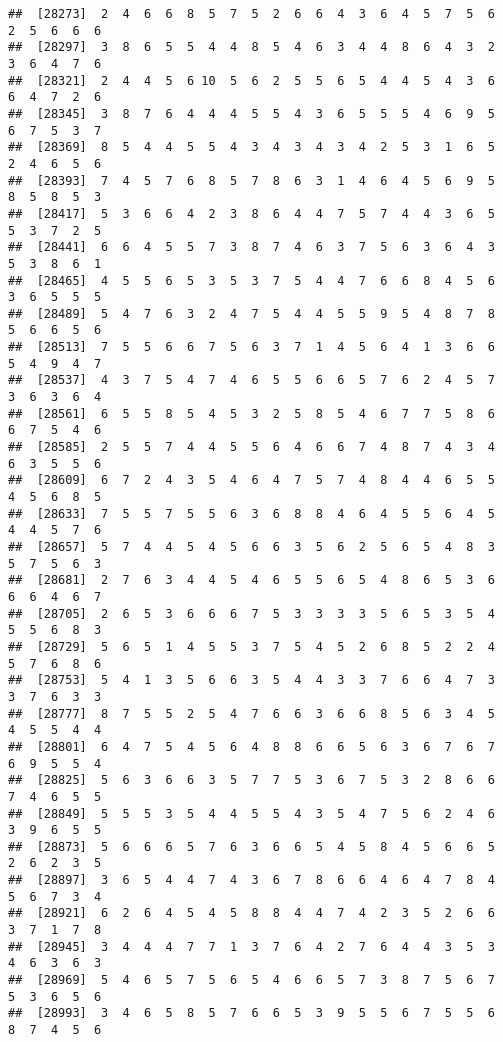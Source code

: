 \documentclass[
]{book}
\begin{document}
\begin{verbatim}
##  [28273]  2  4  6  6  8  5  7  5  2  6  6  4  3  6  4  5  7  5  6  2  5  6  6  6
##  [28297]  3  8  6  5  5  4  4  8  5  4  6  3  4  4  8  6  4  3  2  3  6  4  7  6
##  [28321]  2  4  4  5  6 10  5  6  2  5  5  6  5  4  4  5  4  3  6  6  4  7  2  6
##  [28345]  3  8  7  6  4  4  4  5  5  4  3  6  5  5  5  4  6  9  5  6  7  5  3  7
##  [28369]  8  5  4  4  5  5  4  3  4  3  4  3  4  2  5  3  1  6  5  2  4  6  5  6
##  [28393]  7  4  5  7  6  8  5  7  8  6  3  1  4  6  4  5  6  9  5  8  5  8  5  3
##  [28417]  5  3  6  6  4  2  3  8  6  4  4  7  5  7  4  4  3  6  5  5  3  7  2  5
##  [28441]  6  6  4  5  5  7  3  8  7  4  6  3  7  5  6  3  6  4  3  5  3  8  6  1
##  [28465]  4  5  5  6  5  3  5  3  7  5  4  4  7  6  6  8  4  5  6  3  6  5  5  5
##  [28489]  5  4  7  6  3  2  4  7  5  4  4  5  5  9  5  4  8  7  8  5  6  6  5  6
##  [28513]  7  5  5  6  6  7  5  6  3  7  1  4  5  6  4  1  3  6  6  5  4  9  4  7
##  [28537]  4  3  7  5  4  7  4  6  5  5  6  6  5  7  6  2  4  5  7  3  6  3  6  4
##  [28561]  6  5  5  8  5  4  5  3  2  5  8  5  4  6  7  7  5  8  6  6  7  5  4  6
##  [28585]  2  5  5  7  4  4  5  5  6  4  6  6  7  4  8  7  4  3  4  6  3  5  5  6
##  [28609]  6  7  2  4  3  5  4  6  4  7  5  7  4  8  4  4  6  5  5  4  5  6  8  5
##  [28633]  7  5  5  7  5  5  6  3  6  8  8  4  6  4  5  5  6  4  5  4  4  5  7  6
##  [28657]  5  7  4  4  5  4  5  6  6  3  5  6  2  5  6  5  4  8  3  5  7  5  6  3
##  [28681]  2  7  6  3  4  4  5  4  6  5  5  6  5  4  8  6  5  3  6  6  6  4  6  7
##  [28705]  2  6  5  3  6  6  6  7  5  3  3  3  3  5  6  5  3  5  4  5  5  6  8  3
##  [28729]  5  6  5  1  4  5  5  3  7  5  4  5  2  6  8  5  2  2  4  5  7  6  8  6
##  [28753]  5  4  1  3  5  6  6  3  5  4  4  3  3  7  6  6  4  7  3  3  7  6  3  3
##  [28777]  8  7  5  5  2  5  4  7  6  6  3  6  6  8  5  6  3  4  5  4  5  5  4  4
##  [28801]  6  4  7  5  4  5  6  4  8  8  6  6  5  6  3  6  7  6  7  6  9  5  5  4
##  [28825]  5  6  3  6  6  3  5  7  7  5  3  6  7  5  3  2  8  6  6  7  4  6  5  5
##  [28849]  5  5  5  3  5  4  4  5  5  4  3  5  4  7  5  6  2  4  6  3  9  6  5  5
##  [28873]  5  6  6  6  5  7  6  3  6  6  5  4  5  8  4  5  6  6  5  2  6  2  3  5
##  [28897]  3  6  5  4  4  7  4  3  6  7  8  6  6  4  6  4  7  8  4  5  6  7  3  4
##  [28921]  6  2  6  4  5  4  5  8  8  4  4  7  4  2  3  5  2  6  6  3  7  1  7  8
##  [28945]  3  4  4  4  7  7  1  3  7  6  4  2  7  6  4  4  3  5  3  4  6  3  6  3
##  [28969]  5  4  6  5  7  5  6  5  4  6  6  5  7  3  8  7  5  6  7  5  3  6  5  6
##  [28993]  3  4  6  5  8  5  7  6  6  5  3  9  5  5  6  7  5  5  6  8  7  4  5  6

\end{verbatim}
\end{document}

